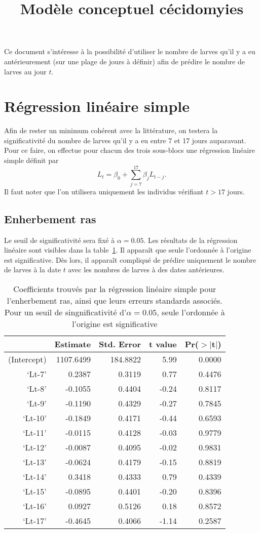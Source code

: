 \documentclass[a4paper, 11pt]{article}
\title{Modèle conceptuel cécidomyies}
\author{}
\date{}
\begin{document}
\maketitle 

Ce document s'intéresse à la possibilité d'utiliser le nombre de larves qu'il y a eu antérieurement (sur une plage de jours à définir) afin de prédire le nombre de larves au jour $t$.

\section{Régression linéaire simple}

Afin de rester un minimum cohérent avec la littérature, on testera la significativité du nombre de larves qu'il y a eu entre 7 et 17 jours auparavant. Pour ce faire, on effectue pour chacun des trois sous-blocs une régression linéaire simple définit par
$$ L_t = \beta_0 + \sum_{j=7}^{17} \beta_{j} L_{t-j}.$$
Il faut noter que l'on utilisera uniquement les individus vérifiant $t > 17$ jours.

\subsection{Enherbement ras}

Le seuil de significativité sera fixé à $\alpha = 0.05$.
Les résultats de la régression linéaire sont visibles dans la table~\ref{tab:lmer}. Il apparaît que seule l'ordonnée à l'origine est significative. Dès lors, il apparaît compliqué de prédire uniquement le nombre de larves à la date $t$ avec les nombres de larves à des dates antérieures.

\begin{table}[ht]
\centering
\caption{Coefficients trouvés par la régression linéaire simple pour l'enherbement ras, ainsi que leurs erreurs standards associés. Pour un seuil de singnificativité d'$\alpha = 0.05$, seule l'ordonnée à l'origine est significative}
\label{tab:lmer}
\begin{tabular}{rrrrr}
 & Estimate & Std. Error & t value & Pr($>$$|$t$|$) \\ 
  \hline
(Intercept) & 1107.6499 & 184.8822 & 5.99 & 0.0000 \\ 
  `Lt-7' & 0.2387 & 0.3119 & 0.77 & 0.4476 \\ 
  `Lt-8' & -0.1055 & 0.4404 & -0.24 & 0.8117 \\ 
  `Lt-9' & -0.1190 & 0.4329 & -0.27 & 0.7845 \\ 
  `Lt-10' & -0.1849 & 0.4171 & -0.44 & 0.6593 \\ 
  `Lt-11' & -0.0115 & 0.4128 & -0.03 & 0.9779 \\ 
  `Lt-12' & -0.0087 & 0.4095 & -0.02 & 0.9831 \\ 
  `Lt-13' & -0.0624 & 0.4179 & -0.15 & 0.8819 \\ 
  `Lt-14' & 0.3418 & 0.4333 & 0.79 & 0.4339 \\ 
  `Lt-15' & -0.0895 & 0.4401 & -0.20 & 0.8396 \\ 
  `Lt-16' & 0.0927 & 0.5126 & 0.18 & 0.8572 \\ 
  `Lt-17' & -0.4645 & 0.4066 & -1.14 & 0.2587 
\end{tabular}
\end{table}
\end{document}
